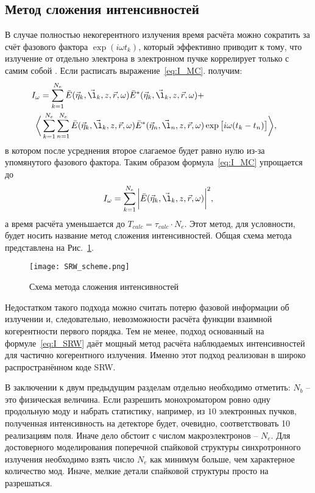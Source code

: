 \subsection{Метод сложения интенсивностей}
В случае полностью некогерентного излучения время расчёта можно сократить за счёт фазового фактора $\exp{(i \omega t_k)}$, который эффективно приводит к тому, что излучение от отдельно электрона в электронном пучке коррелирует только с самим собой \cite{geloni_transverse_2008}. Если расписать выражение~\ref{eq:I_MC}. получим: 
\begin{align}
	I_{\omega} = \sum\limits_{k=1}^{N_e} \bar{E}(\vec{\eta}_k, \vec{\l}_k, z, \vec{r}, \omega)\bar{E}^{*}(\vec{\eta}_k, \vec{\l}_k, z, \vec{r}, \omega) + \cr
	\bigg \langle \sum\limits_{k=1}^{N_e} \sum\limits_{n=1}^{N_e} \bar{E}(\vec{\eta}_k, \vec{\l}_k, z, \vec{r}, \omega)\bar{E}^{*}(\vec{\eta}_n, \vec{\l}_n, z, \vec{r}, \omega) & \exp{\big[i \omega (t_k - t_n)\big]}\bigg \rangle,
	\label{eq:I_SRW_with_explicit_sum} 
\end{align}
в котором после усреднения второе слагаемое будет равно нулю из-за упомянутого фазового фактора. Таким образом формула~\ref{eq:I_MC} упрощается до 
\begin{align}
 	I_{\omega} = \sum\limits_{k=1}^{N_e} \bigg|\bar{E}(\vec{\eta}_k, \vec{\l}_k, z, \vec{r}, \omega)\bigg|^2,
 	\label{eq:I_SRW} 
\end{align}
а время расчёта уменьшается до $T_{calc} = \tau_{calc} \cdot N_e$. Этот метод, для условности, будет носить название метод сложения интенсивностей. Общая схема метода представлена на Рис.~\ref{fig:SRW_scheme}.
\begin{figure}[H] 
	\centering 	\texttt{[image: SRW\_scheme.png]}
	\caption{Схема метода сложения интенсивностей}
	\label{fig:SRW_scheme}
\end{figure}
\noindent  Недостатком такого подхода можно считать потерю фазовой информации об излучении и, следовательно, невозможности расчёта функции взаимной когерентности первого порядка. Тем не менее, подход основанный на формуле~\ref{eq:I_SRW} даёт мощный метод расчёта наблюдаемых интенсивностей для частично когерентного излучения. Именно этот подход реализован в широко распространённом коде SRW.

В заключении к двум предыдущим разделам отдельно необходимо отметить: $N_b$ -- это физическая величина. Если разрешить монохроматором ровно одну продольную моду и набрать статистику, например, из $10$ электронных пучков, полученная интенсивность на детекторе будет, очевидно, соответствовать 10 реализациям поля. Иначе дело обстоит с числом макроэлектронов -- $N_e$. Для достоверного моделирования поперечной спайковой структуры синхротронного излучения необходимо взять число $N_e$ как минимум больше, чем характерное количество мод. Иначе, мелкие детали спайковой структуры просто на разрешаться.
  
